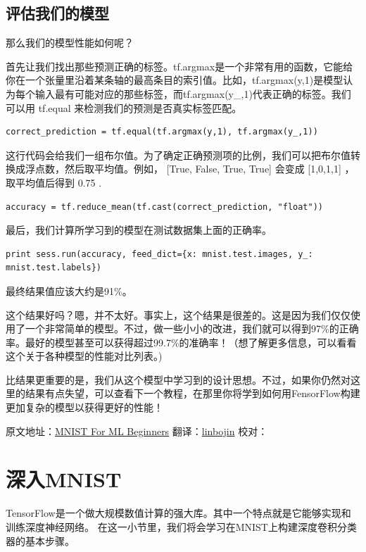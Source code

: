 \documentclass[a4paper,11pt,twoside]{ctexbook}
\begin{document}
\subsection{评估我们的模型}

那么我们的模型性能如何呢？

首先让我们找出那些预测正确的标签。tf.argmax是一个非常有用的函数，它能给你在一个张量里沿着某条轴的最高条目的索引值。比如，tf.argmax(y,1)是模型认为每个输入最有可能对应的那些标签，而tf.argmax(y\_,1)代表正确的标签。我们可以用 tf.equal 来检测我们的预测是否真实标签匹配。

\begin{lstlisting}
correct_prediction = tf.equal(tf.argmax(y,1), tf.argmax(y_,1))
\end{lstlisting}

这行代码会给我们一组布尔值。为了确定正确预测项的比例，我们可以把布尔值转换成浮点数，然后取平均值。例如， [True, False, True, True] 会变成 [1,0,1,1] ，取平均值后得到 0.75 .

\begin{lstlisting}
accuracy = tf.reduce_mean(tf.cast(correct_prediction, "float"))
\end{lstlisting}

最后，我们计算所学习到的模型在测试数据集上面的正确率。

\begin{lstlisting}
print sess.run(accuracy, feed_dict={x: mnist.test.images, y_: mnist.test.labels})
\end{lstlisting}

最终结果值应该大约是91\%。

这个结果好吗？嗯，并不太好。事实上，这个结果是很差的。这是因为我们仅仅使用了一个非常简单的模型。不过，做一些小小的改进，我们就可以得到97\%的正确率。最好的模型甚至可以获得超过99.7\%的准确率！（想了解更多信息，可以看看这个关于各种模型的性能对比列表。)

比结果更重要的是，我们从这个模型中学习到的设计思想。不过，如果你仍然对这里的结果有点失望，可以查看下一个教程，在那里你将学到如何用FensorFlow构建更加复杂的模型以获得更好的性能！

原文地址：\href{http://tensorflow.org/tutorials/mnist/beginners/index.md}{MNIST For ML Beginners}
翻译：\href{https://github.com/linbojin}{linbojin} 校对：

\newpage
\section {深入MNIST} \label{MINIST_pros}
TensorFlow是一个做大规模数值计算的强大库。其中一个特点就是它能够实现和训练深度神经网络。 在这一小节里，我们将会学习在MNIST上构建深度卷积分类器的基本步骤。
\end{document}
